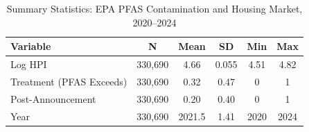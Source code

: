 \begin{table}[h]
\centering
\caption{Summary Statistics: EPA PFAS Contamination and Housing Market, 2020--2024}
\label{table:sumstats}
\begin{tabular}{lccccc}
\toprule
Variable & N & Mean & SD & Min & Max \\
\midrule
Log HPI & 330,690 & 4.66 & 0.055 & 4.51 & 4.82 \\
Treatment (PFAS Exceeds) & 330,690 & 0.32 & 0.47 & 0 & 1 \\
Post-Announcement & 330,690 & 0.20 & 0.40 & 0 & 1 \\
Year & 330,690 & 2021.5 & 1.41 & 2020 & 2024 \\
\bottomrule
\end{tabular}
\end{table}
